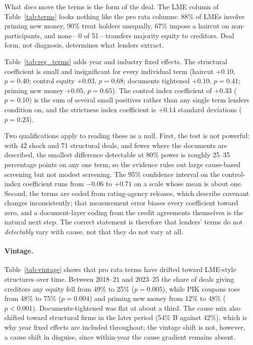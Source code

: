 \documentclass[12pt]{article}
\begin{document}
What \emph{does} move the terms is the form of the deal. The LME column of Table~\ref{tab:terms} looks nothing like the pro rata columns: 88\% of LMEs involve priming new money, 90\% treat holders unequally, 67\% impose a haircut on non-participants, and none---0 of 51---transfers majority equity to creditors. Deal form, not diagnosis, determines what lenders extract.

Table~\ref{tab:reg_terms} adds year and industry fixed effects. The structural coefficient is small and insignificant for every individual term (haircut $+0.10$, $p = 0.40$; control equity $+0.03$, $p = 0.68$; documents tightened $+0.10$, $p = 0.41$; priming new money $+0.05$, $p = 0.65$). The control index coefficient of $+0.33$ ($p = 0.10$) is the sum of several small positives rather than any single term lenders condition on, and the strictness index coefficient is $+0.14$ standard deviations ($p = 0.23$).



Two qualifications apply to reading these as a null. First, the test is not powerful: with 42 shock and 71 structural deals, and fewer where the documents are described, the smallest difference detectable at 80\% power is roughly 25--35 percentage points on any one term, so the evidence rules out large cause-based screening but not modest screening. The 95\% confidence interval on the control-index coefficient runs from $-0.06$ to $+0.71$ on a scale whose mean is about one. Second, the terms are coded from rating-agency releases, which describe covenant changes inconsistently; that measurement error biases every coefficient toward zero, and a document-layer coding from the credit agreements themselves is the natural next step. The correct statement is therefore that lenders' terms do not \emph{detectably} vary with cause, not that they do not vary at all.

\paragraph{Vintage.} Table~\ref{tab:vintage} shows that pro rata terms have drifted toward LME-style structures over time. Between 2018--21 and 2023--25 the share of deals giving creditors any equity fell from 49\% to 25\% ($p = 0.005$), while PIK coupons rose from 48\% to 75\% ($p = 0.004$) and priming new money from 12\% to 48\% ($p < 0.001$). Documents-tightened was flat at about a third. The cause mix also shifted toward structural firms in the later period (54\% B against 42\%), which is why year fixed effects are included throughout; the vintage shift is not, however, a cause shift in disguise, since within-year the cause gradient remains absent.
\end{document}
